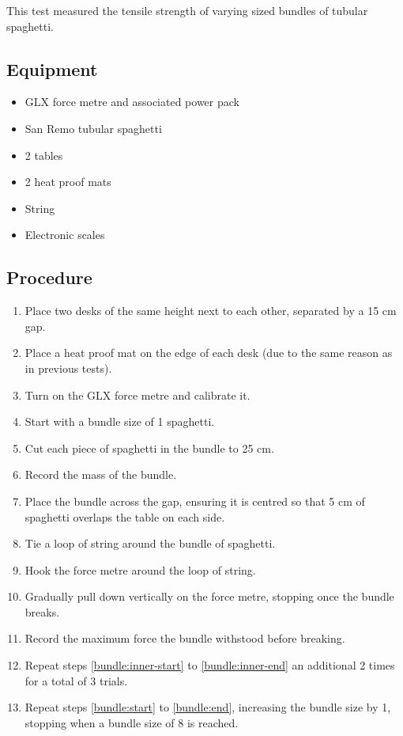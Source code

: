 \documentclass[a4paper,11pt]{article}
\begin{document}
This test measured the tensile strength of varying sized bundles of tubular
spaghetti.


\subsection{Equipment}

\begin{itemize}
\item GLX force metre and associated power pack
\item San Remo tubular spaghetti
\item 2 tables
\item 2 heat proof mats
\item String
\item Electronic scales
\end{itemize}


\subsection{Procedure}

\begin{enumerate}
\item Place two desks of the same height next to each other, separated by a 15
	cm gap.
\item Place a heat proof mat on the edge of each desk (due to the same reason as
	in previous tests).
\item Turn on the GLX force metre and calibrate it.
\item \label{bundle:start} Start with a bundle size of 1 spaghetti.
\item Cut each piece of spaghetti in the bundle to 25 cm.
\item Record the mass of the bundle.
\item \label{bundle:inner-start} Place the bundle across the gap, ensuring it
	is centred so that 5 cm of spaghetti overlaps the table on each side.
\item Tie a loop of string around the bundle of spaghetti.
\item Hook the force metre around the loop of string.
\item Gradually pull down vertically on the force metre, stopping once the
	bundle breaks.
\item \label{bundle:inner-end} Record the maximum force the bundle withstood
	before breaking.
\item \label{bundle:end} Repeat steps \ref{bundle:inner-start} to
	\ref{bundle:inner-end} an additional 2 times for a total of 3 trials.
\item Repeat steps \ref{bundle:start} to \ref{bundle:end}, increasing the bundle
	size by 1, stopping when a bundle size of 8 is reached.
\end{enumerate}
\end{document}
